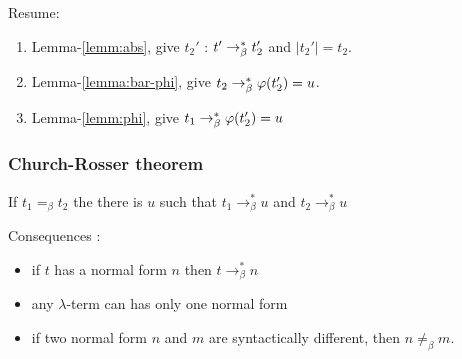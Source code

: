     Resume:
    \begin{enumerate}
      \item Lemma-\ref{lemm:abs}, give $t_2'$ : $t' \to_\beta^* t_2'$ and $|t_2'| =
        t_2$.
      \item Lemma-\ref{lemma:bar-phi}, give $t_2 \to_\beta^* \varphi(t_2') = u$.
      \item Lemma-\ref{lemm:phi}, give $t_1 \to_\beta^* \varphi(t_2') = u$
    \end{enumerate}

  \qedsymbol


  \subsubsection{Church-Rosser theorem}

  If $t_1 =_\beta t_2$ the there is $u$ such that $t_1 \to_\beta^* u$ and $t_2
  \to_\beta^* u$

  Consequences :

  \begin{itemize}
    \item if $t$ has a normal form $n$ then $t \to_\beta^* n$

    \item any $\lambda$-term can has only one normal form

    \item if two normal form $n$ and $m$ are syntactically different, then $n
      \not =_\beta m$.
  \end{itemize}

